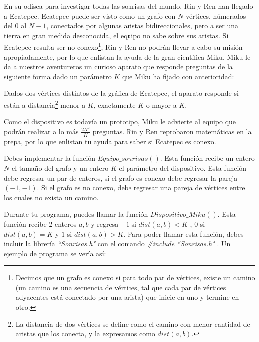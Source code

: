 \documentclass[12pt]{scrartcl}
\begin{document}

    
    \vspace{10pt}

    

        En su odisea para investigar todas las sonrisas del mundo, Rin y Ren han llegado a Ecatepec. Ecatepec puede ser visto como un grafo con $N$ vértices, númerados del $0$ al $N - 1$, conectados por algunas aristas bidireccionales, pero a ser una tierra en gran medida desconocida, el equipo no sabe sobre sus aristas. Si Ecatepec resulta ser no conexo\footnote{Decimos que un grafo es conexo si para todo par de vértices, existe un camino (un camino es una secuencia de vértices, tal que cada par de vértices adyacentes está conectado por una arista) que inicie en uno y termine en otro.}, Rin y Ren no podrán llevar a cabo su misión apropiadamente, por lo que enlistan la ayuda de la gran científica Miku. Miku le da a nuestros aventureros un curioso aparato que responde preguntas de la siguiente forma dado un parámetro $K$ que Miku ha fijado con anterioridad:

        Dados dos vértices distintos de la gráfica de Ecatepec, el aparato responde si están a distancia\footnote{La distancia de dos vértices se define como el camino con menor cantidad de aristas que los conecta, y la expresamos como $dist(a, b)$.} menor a $K$, exactamente $K$ o mayor a $K$.

        Como el dispositivo es todavía un prototipo, Miku le advierte al equipo que podrán realizar a lo más $\frac{2N^2}{K}$ preguntas. Rin y Ren reprobaron matemáticas en la prepa, por lo que enlistan tu ayuda para saber si Ecatepec es conexo.
        

        

        Debes implementar la función $Equipo\_sonrisas()$. Esta función recibe un entero $N$ el tamaño del grafo y un entero $K$ el parámetro del dispositivo. Esta función debe regresar un par de enteros, si el grafo es conexo debe regresar la pareja $(-1, -1)$. Si el grafo es no conexo, debe regresar una pareja de vértices entre los cuales no exista un camino. 
        
        Durante tu programa, puedes llamar la función $Dispositivo\_Miku()$. Esta función recibe 2 enteros $a, b$ y regresa $-1$ si $dist(a, b) < K$ , $0$ si $dist(a, b) = K$ y $1$ si $dist(a, b) > K$.
        Para poder llamar esta función, debes incluir la librería \textit{``Sonrisas.h"} con el comando \textit{ \#include ``Sonrisas.h" }.
        Un ejemplo de programa se vería así:
\end{document}
